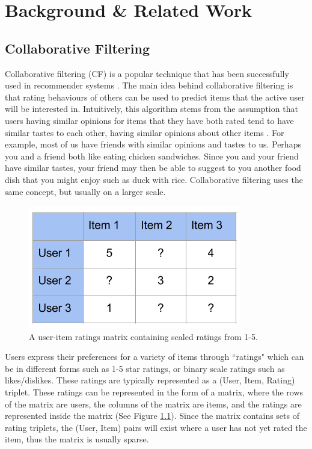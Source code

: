 \chapter{Background \& Related Work}\label{C:background}

\section{Collaborative Filtering}

Collaborative filtering (CF) is a popular technique that has been successfully used in recommender systems \cite{itembased, schafer2007collaborative, survey}. The main idea behind collaborative filtering is that rating behaviours of others can be used to predict items that the active user will be interested in. Intuitively, this algorithm stems from the assumption that users having similar opinions for items that they have both rated tend to have similar tastes to each other, having similar opinions about other items  \cite{schafer2007collaborative}. For example, most of us have friends with similar opinions and tastes to us. Perhaps you and a friend both like eating chicken sandwiches. Since you and your friend have similar tastes, your friend may then be able to suggest to you another food dish that you might enjoy such as duck with rice. Collaborative filtering uses the same concept, but usually on a larger scale. 

\begin{figure}
\centering
\includegraphics[scale=0.7]{images/User-Item}
\caption{A user-item ratings matrix containing scaled ratings from 1-5.}
\label{fig:matrix}
\end{figure}

Users express their preferences for a variety of items through ``ratings" which can be in different forms such as 1-5 star ratings, or binary scale ratings such as likes/dislikes. These ratings are typically represented as a (User, Item, Rating) triplet. These ratings can be represented in the form of a matrix, where the rows of the matrix are users, the columns of the matrix are items, and the ratings are represented inside the matrix (See Figure \ref{fig:matrix}). Since the matrix contains sets of rating triplets, the (User, Item) pairs will exist where a user has not yet rated the item, thus the matrix is usually sparse.

